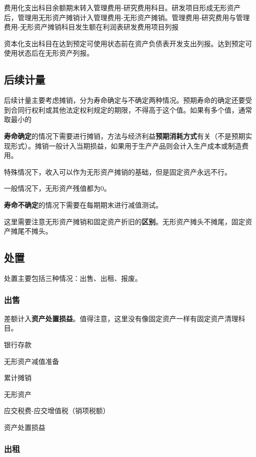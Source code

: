 \documentclass[UTF8,12pt]{ctexart}
\newenvironment{Dr}{%
	\begin{list}{}%
		{
			\setlength{\leftmargin}{2em}
			\setlength{\labelwidth}{2em}
			\setlength{\labelsep}{0pt}
			\setlength{\itemindent}{0pt}
			\setlength{\listparindent}{0pt}
			\setlength{\parsep}{0pt}
			\setlength{\topsep}{0pt}
		}
		\item[\textbf{借：}]
	}{%
	\end{list}
}
\newenvironment{Cr}{%
	\begin{list}{}%
		{
			\setlength{\leftmargin}{3em}
			\setlength{\labelwidth}{2em}
			\setlength{\labelsep}{0pt}
			\setlength{\itemindent}{0pt}
			\setlength{\listparindent}{0pt}
			\setlength{\parsep}{0pt}
			\setlength{\topsep}{0pt}
		}
		\item[\textbf{贷：}]
	}{%
	\end{list}
}
\numberwithin{equation}{section} %
\numberwithin{figure}{section}
\numberwithin{table}{section}
\begin{document}
	费用化支出科目余额期末转入管理费用-研究费用科目。研发项目形成无形资产后，管理用无形资产摊销计入管理费用-无形资产摊销。管理费用-研究费用与管理费用-无形资产摊销科目发生额在利润表研发费用项目列报
	
	资本化支出科目在达到预定可使用状态前在资产负债表开发支出列报。达到预定可使用状态后在无形资产列报。
	
	
	
	\subsection{后续计量}
	后续计量主要考虑摊销，分为寿命确定与不确定两种情况。预期寿命的确定还要受到合同行权利或其他法定权利规定的期限，不得高于这个值。如果有多个值，通常取最小的
	
	\textbf{寿命确定}的情况下需要进行摊销，方法与经济利益\textbf{预期消耗方式}有关（不是预期实现形式）。摊销一般计入当期损益，如果用于生产产品则会计入生产成本或制造费用。
	
	特殊情况下，收入可以作为无形资产摊销的基础，但是固定资产永远不行。
	
	一般情况下，无形资产残值都为0。
	
	\textbf{寿命不确定}的情况下需要在每期期末进行减值测试。
	
	这里需要注意无形资产摊销和固定资产折旧的\textbf{区别}。无形资产摊头不摊尾，固定资产摊尾不摊头。
	
	\subsection{处置}
	
	处置主要包括三种情况：出售、出租、报废。
	
	\subsubsection{出售}
	差额计入\textbf{资产处置损益}。值得注意，这里没有像固定资产一样有固定资产清理科目。
	
	\begin{Dr}
		银行存款
		
		无形资产减值准备
		
		累计摊销
	\end{Dr}
	\begin{Cr}
		无形资产
		
		应交税费-应交增值税（销项税额）
		
		资产处置损益
	\end{Cr}
	
	\subsubsection{出租}
	
\end{document}
